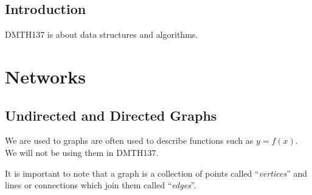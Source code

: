 %
\maketitle
%
%
\section{Introduction}
\label{sec:Introduction}
DMTH137 is about data structures and algorithms.
\tableofcontents
%
\newpage

\chapter{Networks}
\label{chap:Networks}
\section{Undirected and Directed Graphs}
\label{sec:UndirectedAndDirectedGraphs}

We are used to graphs are often used to describe functions such as $y = f(x)$.
We will not be using them in DMTH137.

It is important to note that a graph is a collection of points
called ``\emph{vertices}'' and lines or connections which join them called
``\emph{edges}''.

